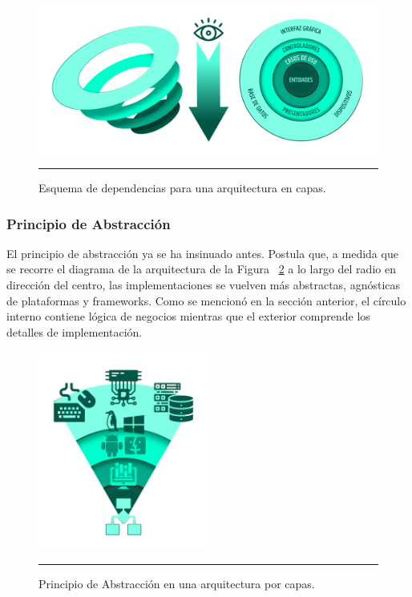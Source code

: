 \begin{figure}[htbp]
	\centering
	\includegraphics[width=1\textwidth]{Figures/arch_regla_dependencias}
	\rule{35em}{1pt}
	\caption[Principio de Dependecias]{Esquema de dependencias para una arquitectura en capas.}
	\label{fig:Diagrama_clasico}
\end{figure}

\subsubsection{Principio de Abstracción}
El principio de abstracción ya se ha insinuado antes. Postula que, a medida que se recorre el diagrama de la arquitectura de la Figura ~\ref{fig:C2_PA} a lo largo del radio en dirección del centro, las implementaciones se vuelven más abstractas, agnósticas de plataformas y frameworks. Como se mencionó en la sección anterior, el círculo interno contiene lógica de negocios mientras que el exterior comprende los detalles de implementación.

\begin{figure}[htbp]
	\centering
	\includegraphics[width=0.5\textwidth]{Figures/arch_regla_abstraccion.png}
	\rule{35em}{1pt}
	\caption[Abstraction Principle]{Principio de Abstracción en una arquitectura por capas.}
	\label{fig:C2_PA}
\end{figure}

